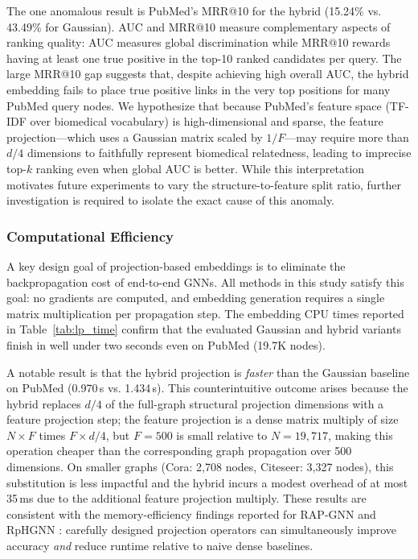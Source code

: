 \documentclass[conference]{IEEEtran}
\begin{document}
The one anomalous result is PubMed's MRR@10 for the hybrid (15.24\%
vs. 43.49\% for Gaussian). AUC and MRR@10 measure complementary aspects of
ranking quality: AUC measures global discrimination while MRR@10 rewards
having at least one true positive in the top-10 ranked candidates per query.
The large MRR@10 gap suggests that, despite achieving high overall AUC, the
hybrid embedding fails to place true positive links in the very top positions
for many PubMed query nodes. We hypothesize that because PubMed's feature
space (TF-IDF over biomedical vocabulary) is high-dimensional and sparse,
the feature projection---which uses a Gaussian matrix scaled by $1/F$---may
require more than $d/4$ dimensions to faithfully represent biomedical
relatedness, leading to imprecise top-$k$ ranking even when global AUC is
better. While this interpretation motivates future experiments to vary the
structure-to-feature split ratio, further investigation is required to
isolate the exact cause of this anomaly.

\subsubsection{Computational Efficiency}

A key design goal of projection-based embeddings is to eliminate the
backpropagation cost of end-to-end GNNs. All methods in this study
satisfy this goal: no gradients are computed, and embedding generation
requires a single matrix multiplication per propagation step. The embedding
CPU times reported in Table~\ref{tab:lp_time} confirm that the evaluated
Gaussian and hybrid variants finish in well under two seconds even on
PubMed (19.7K nodes).

A notable result is that the hybrid projection is \emph{faster} than the
Gaussian baseline on PubMed (0.970\,s vs. 1.434\,s). This counterintuitive
outcome arises because the hybrid replaces $d/4$ of the full-graph structural
projection dimensions with a feature projection step; the feature projection
is a dense matrix multiply of size $N \times F$ times $F \times d/4$, but
$F = 500$ is small relative to $N = 19{,}717$, making this operation
cheaper than the corresponding graph propagation over 500 dimensions. On
smaller graphs (Cora: 2,708 nodes, Citeseer: 3,327 nodes), this substitution
is less impactful and the hybrid incurs a modest overhead of at most 35\,ms
due to the additional feature projection multiply. These results are
consistent with the memory-efficiency findings reported for RAP-GNN
\cite{bui2023rap} and RpHGNN \cite{hu2021rphgnn}: carefully designed
projection operators can simultaneously improve accuracy \emph{and} reduce
runtime relative to naive dense baselines.
\end{document}
